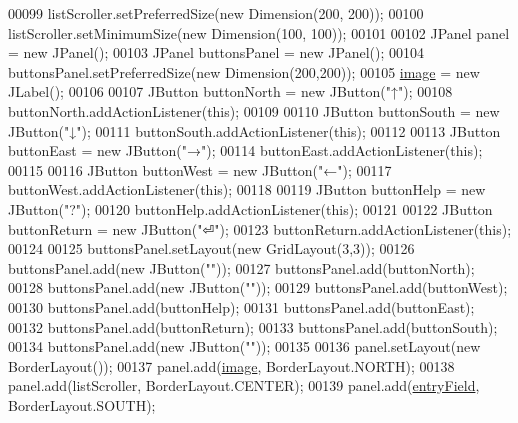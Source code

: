 \begin{DoxyCode}
00099         listScroller.setPreferredSize(\textcolor{keyword}{new} Dimension(200, 200));
00100         listScroller.setMinimumSize(\textcolor{keyword}{new} Dimension(100, 100));
00101 
00102         JPanel panel = \textcolor{keyword}{new} JPanel();
00103         JPanel buttonsPanel = \textcolor{keyword}{new} JPanel();
00104         buttonsPanel.setPreferredSize(\textcolor{keyword}{new} Dimension(200,200));
00105         \hyperlink{classUserInterface_a0d115eb19b54f3e002ec6aa0fcfb1db4}{image} = \textcolor{keyword}{new} JLabel();
00106 
00107         JButton buttonNorth = \textcolor{keyword}{new} JButton(\textcolor{stringliteral}{"↑"});
00108         buttonNorth.addActionListener(\textcolor{keyword}{this});
00109 
00110         JButton buttonSouth = \textcolor{keyword}{new} JButton(\textcolor{stringliteral}{"↓"});
00111         buttonSouth.addActionListener(\textcolor{keyword}{this});
00112 
00113         JButton buttonEast = \textcolor{keyword}{new} JButton(\textcolor{stringliteral}{"→"});
00114         buttonEast.addActionListener(\textcolor{keyword}{this});
00115 
00116         JButton buttonWest = \textcolor{keyword}{new} JButton(\textcolor{stringliteral}{"←"});
00117         buttonWest.addActionListener(\textcolor{keyword}{this});
00118 
00119         JButton buttonHelp = \textcolor{keyword}{new} JButton(\textcolor{stringliteral}{"?"});
00120         buttonHelp.addActionListener(\textcolor{keyword}{this});
00121 
00122         JButton buttonReturn = \textcolor{keyword}{new} JButton(\textcolor{stringliteral}{"⏎"});
00123         buttonReturn.addActionListener(\textcolor{keyword}{this});
00124 
00125         buttonsPanel.setLayout(\textcolor{keyword}{new} GridLayout(3,3));
00126         buttonsPanel.add(\textcolor{keyword}{new} JButton(\textcolor{stringliteral}{""}));
00127         buttonsPanel.add(buttonNorth);
00128         buttonsPanel.add(\textcolor{keyword}{new} JButton(\textcolor{stringliteral}{""}));
00129         buttonsPanel.add(buttonWest);
00130         buttonsPanel.add(buttonHelp);
00131         buttonsPanel.add(buttonEast);
00132         buttonsPanel.add(buttonReturn);
00133         buttonsPanel.add(buttonSouth);
00134         buttonsPanel.add(\textcolor{keyword}{new} JButton(\textcolor{stringliteral}{""}));
00135 
00136         panel.setLayout(\textcolor{keyword}{new} BorderLayout());
00137         panel.add(\hyperlink{classUserInterface_a0d115eb19b54f3e002ec6aa0fcfb1db4}{image}, BorderLayout.NORTH);
00138         panel.add(listScroller, BorderLayout.CENTER);
00139         panel.add(\hyperlink{classUserInterface_a940367d996e9e7ad6e1fa1abfe35128b}{entryField}, BorderLayout.SOUTH);

\end{DoxyCode}
